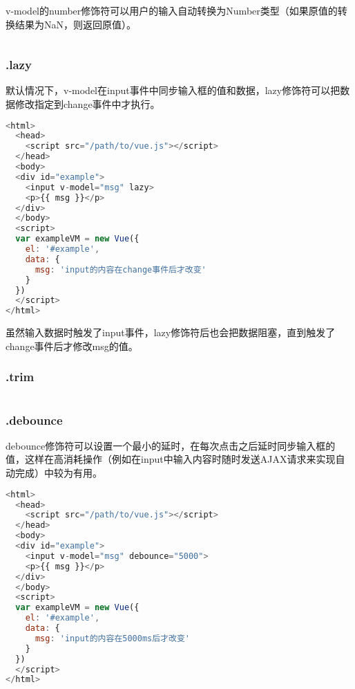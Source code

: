 v-model的number修饰符可以用户的输入自动转换为Number类型（如果原值的转换结果为NaN，则返回原值）。

\begin{lstlisting}[language=JavaScript]

\end{lstlisting}


\subsubsection{.lazy}

默认情况下，v-model在input事件中同步输入框的值和数据，lazy修饰符可以把数据修改指定到change事件中才执行。

\begin{lstlisting}[language=JavaScript]
<html>
  <head>
    <script src="/path/to/vue.js"></script>
  </head>
  <body>
  <div id="example">
    <input v-model="msg" lazy>
    <p>{{ msg }}</p>
  </div>
  </body>
  <script>
  var exampleVM = new Vue({
    el: '#example',
    data: {
      msg: 'input的内容在change事件后才改变'
    }
  })
  </script>
</html>
\end{lstlisting}

虽然输入数据时触发了input事件，lazy修饰符后也会把数据阻塞，直到触发了change事件后才修改msg的值。

\subsubsection{.trim}


\begin{lstlisting}[language=JavaScript]

\end{lstlisting}


\subsubsection{.debounce}

debounce修饰符可以设置一个最小的延时，在每次点击之后延时同步输入框的值，这样在高消耗操作（例如在input中输入内容时随时发送AJAX请求来实现自动完成）中较为有用。



\begin{lstlisting}[language=JavaScript]
<html>
  <head>
    <script src="/path/to/vue.js"></script>
  </head>
  <body>
  <div id="example">
    <input v-model="msg" debounce="5000">
    <p>{{ msg }}</p>
  </div>
  </body>
  <script>
  var exampleVM = new Vue({
    el: '#example',
    data: {
      msg: 'input的内容在5000ms后才改变'
    }
  })
  </script>
</html>
\end{lstlisting}




